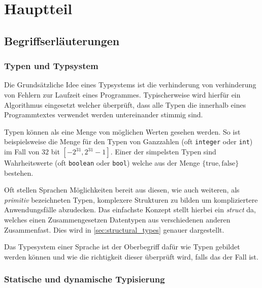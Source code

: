 \section{Hauptteil}

\subsection{Begriffserläuterungen}

\subsubsection{Typen und Typsystem}

Die Grundsätzliche Idee eines Typsystems ist die verhinderung von verhinderung von Fehlern zur
Laufzeit eines Programmes. Typischerweise wird hierfür ein Algorithmus eingesetzt welcher überprüft,
dass alle Typen die innerhalb eines Programmtextes verwendet werden untereinander stimmig sind.

Typen können als eine Menge von möglichen Werten gesehen werden. So ist beispielsweise die Menge
für den Typen von Ganzzahlen (oft \texttt{integer} oder \texttt{int}) im Fall von $32$ bit 
$[-2^{31},2^{31}-1]$.
Einer der simpelsten Typen sind Wahrheitswerte (oft \texttt{boolean} oder \texttt{bool}) welche aus 
der Menge $\{\text{true}, \text{false}\}$ bestehen.

Oft stellen Sprachen Möglichkeiten bereit aus diesen, wie auch weiteren, 
als \textit{primitiv} bezeichneten Typen, komplexere Strukturen zu bilden um kompliziertere Anwendungsfälle
abzudecken. Das einfachste Konzept stellt hierbei ein \textit{struct} da, welches einen Zusammengesetzen
Datentypen aus verschiedenen anderen Zusammenfast. Dies wird in \ref{sec:structural_types} genauer dargestellt.


Das Typesystem einer Sprache ist der Oberbegriff dafür wie Typen gebildet werden können und wie die richtigkeit dieser
überprüft wird, falls das der Fall ist.

\subsubsection{Statische und dynamische Typisierung}
